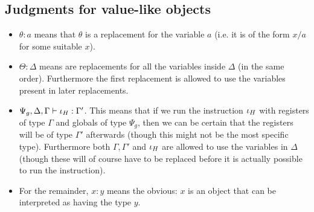 \fbox{$\subtype{}{\phi}{\phi}$}

\fbox{$\subtype{\Delta}{\tau^\phi}{\tau^\phi}$}
\begin{mathpar}
\end{mathpar}

\fbox{$\subtype{\Delta}{\sigma}{\sigma}$}

\fbox{$\subtype{\Delta}{\Gamma}{\Gamma}$}
\begin{mathpar}
\end{mathpar}

\subsection{Judgments for value-like objects}

\begin{itemize}
\item $\theta : a$ means that $\theta$ is a replacement for the variable $a$
  (i.e. it is of the form $x / a$ for some suitable $x$).
\item $\Theta : \Delta$ means are replacements for all the variables inside
  $\Delta$ (in the same order). Furthermore the first replacement is allowed
  to use the variables present in later replacements.
\item $\Psi_g, \Delta, \Gamma |- \high{\iota} : \Gamma'$. This means that if
  we run the instruction $\high \iota$ with registers of type $\Gamma$ and
  globals of type $\Psi_g$, then we can be certain that the registers will be
  of type $\Gamma'$ afterwards (though this might not be the most specific
  type). Furthermore both $\Gamma, \Gamma'$ and $\high \iota$ are allowed to
  use the variables in $\Delta$ (though these will of course have to be
  replaced before it is actually possible to run the instruction).
\item For the remainder, $x : y$ means the obvious: $x$ is an object that can be
  interpreted as having the type $y$.
\end{itemize}

